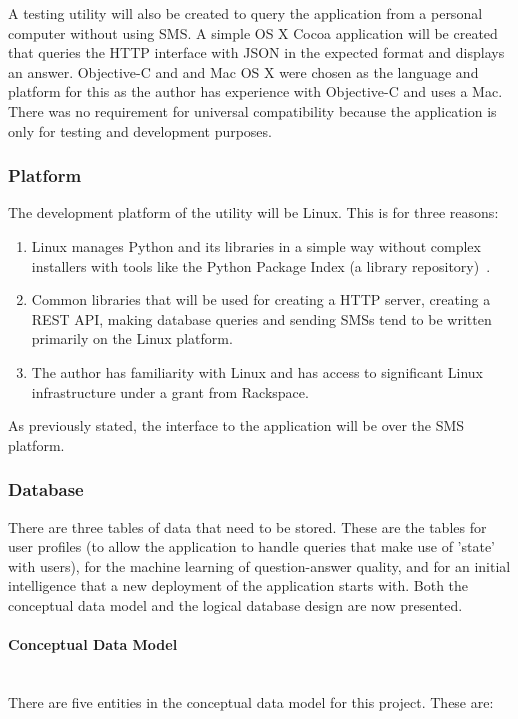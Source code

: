 \documentclass{article}
\newcommand{\myparagraph}[1]{\paragraph{#1}\mbox{}\\}
\begin{document}
A testing utility will also be created to query the application from a personal computer without using SMS.  A simple OS X Cocoa application will be created that queries the HTTP interface with JSON in the expected format and displays an answer.  Objective-C and and Mac OS X were chosen as the language and platform for this as the author has experience with Objective-C and uses a Mac.  There was no requirement for universal compatibility because the application is only for testing and development purposes.

\subsubsection{Platform}
The development platform of the utility will be Linux.  This is for three reasons:
\begin{enumerate}
  \item Linux manages Python and its libraries in a simple way without complex installers with tools like the Python Package Index (a library repository)~\cite{pypi}.
  \item Common libraries that will be used for creating a HTTP server, creating a REST API, making database queries and sending SMSs tend to be written primarily on the Linux platform.
  \item The author has familiarity with Linux and has access to significant Linux infrastructure under a grant from Rackspace.
\end{enumerate}

As previously stated, the interface to the application will be over the SMS platform.

\subsubsection{Database}
There are three tables of data that need to be stored.  These are the tables for user profiles (to allow the application to handle queries that make use of 'state' with users), for the machine learning of question-answer quality, and for an initial intelligence that a new deployment of the application starts with.  Both the conceptual data model and the logical database design are now presented.

\myparagraph{Conceptual Data Model}
There are five entities in the conceptual data model for this project.  These are:
\end{document}

